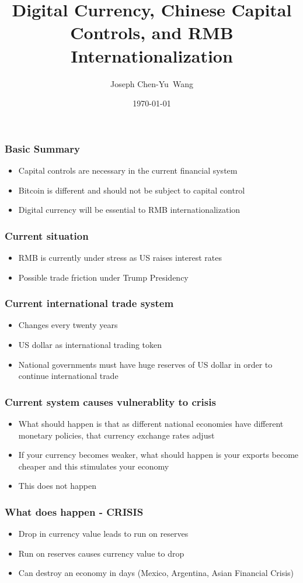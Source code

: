 \documentclass{beamer}
\title {Digital Currency, Chinese Capital Controls, and RMB Internationalization}
\author{Joseph Chen-Yu~Wang}
\institute{Bitquant Research Laboratories (Asia) Limited}
\date{\today}
\begin{document}
\frame{\titlepage}
\begin{frame}
  \frametitle{Basic Summary}
  \begin{itemize}
    \item Capital controls are necessary in the current financial
      system
    \item Bitcoin is different and should not be subject to capital
      control
    \item Digital currency will be essential to RMB
      internationalization
  \end{itemize}
\end{frame}
\begin{frame}
  \frametitle{Current situation}
  \begin{itemize}
  \item RMB is currently under stress as US raises interest rates
  \item Possible trade friction under Trump Presidency
  \end{itemize}
\end{frame}
\begin{frame}
  \frametitle{Current international trade system}
  \begin{itemize}
  \item Changes every twenty years
  \item US dollar as international trading token
    \item National governments must have huge reserves of US dollar in
      order to continue international trade
  \end{itemize}
\end{frame}
\begin{frame}
  \frametitle{Current system causes vulnerablity to crisis}
  \begin{itemize}
    \item What should happen is that as different national economies
      have different monetary policies, that currency exchange rates
      adjust
    \item If your currency becomes weaker, what should happen is your
      exports become cheaper and this stimulates your economy
    \item This does not happen
  \end{itemize}
\end{frame}
\begin{frame}
  \frametitle{What does happen - CRISIS}
  \begin{itemize}
  \item Drop in currency value leads to run on reserves
  \item Run on reserves causes currency value to drop
  \item Can destroy an economy in days (Mexico, Argentina, Asian
    Financial Crisis)
  \end{itemize}
\end{frame}
\end{document}
